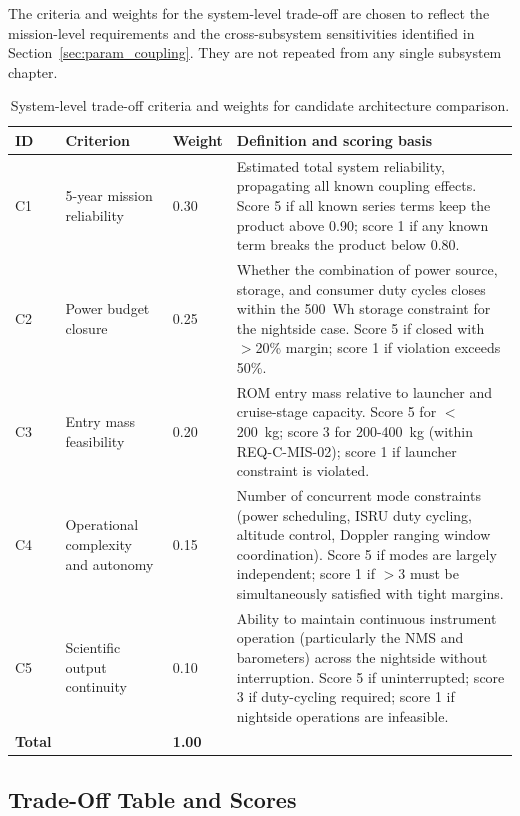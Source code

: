 The criteria and weights for the system-level trade-off are chosen to reflect the mission-level requirements and the cross-subsystem sensitivities identified in Section~\ref{sec:param_coupling}. They are not repeated from any single subsystem chapter.

\begin{table}[h!]
\centering
\caption{System-level trade-off criteria and weights for candidate architecture comparison.}
\label{tab:arch_criteria}
\renewcommand{\arraystretch}{1.25}
\begin{tabular}{p{0.5cm}p{4.0cm}p{0.8cm}p{8.0cm}}
\hline
\textbf{ID} & \textbf{Criterion} & \textbf{Weight} & \textbf{Definition and scoring basis} \\
\hline
C1 & 5-year mission reliability & 0.30 & Estimated total system reliability, propagating all known coupling effects. Score 5 if all known series terms keep the product above 0.90; score 1 if any known term breaks the product below 0.80. \\
C2 & Power budget closure & 0.25 & Whether the combination of power source, storage, and consumer duty cycles closes within the 500~Wh storage constraint for the nightside case. Score 5 if closed with $>$20\% margin; score 1 if violation exceeds 50\%. \\
C3 & Entry mass feasibility & 0.20 & ROM entry mass relative to launcher and cruise-stage capacity. Score 5 for $<$200~kg; score 3 for 200-400~kg (within REQ-C-MIS-02); score 1 if launcher constraint is violated. \\
C4 & Operational complexity and autonomy & 0.15 & Number of concurrent mode constraints (power scheduling, ISRU duty cycling, altitude control, Doppler ranging window coordination). Score 5 if modes are largely independent; score 1 if $>$3 must be simultaneously satisfied with tight margins. \\
C5 & Scientific output continuity & 0.10 & Ability to maintain continuous instrument operation (particularly the NMS and barometers) across the nightside without interruption. Score 5 if uninterrupted; score 3 if duty-cycling required; score 1 if nightside operations are infeasible. \\
\hline
\textbf{Total} & & \textbf{1.00} & \\
\hline
\end{tabular}
\end{table}

\subsection{Trade-Off Table and Scores}
\label{subsec:arch_scores}

